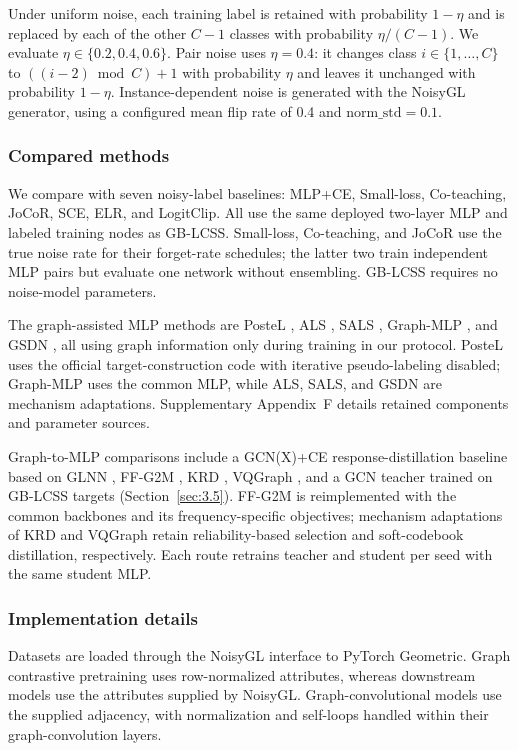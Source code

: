 \documentclass[times,review,10pt]{elsarticle}
\theoremstyle{definition}
\theoremstyle{plain}
\begin{document}
Under uniform noise, each training label is retained with probability \(1-\eta\) and is replaced by each of the other \(C-1\) classes with probability \(\eta/(C-1)\). We evaluate \(\eta\in\{0.2,0.4,0.6\}\). Pair noise uses \(\eta=0.4\): it changes class \(i\in\{1,\ldots,C\}\) to \(((i-2)\bmod C)+1\) with probability \(\eta\) and leaves it unchanged with probability \(1-\eta\). Instance-dependent noise is generated with the NoisyGL generator, using a configured mean flip rate of 0.4 and \(\text{norm\_std}=0.1\).

\subsubsection{Compared methods}\label{sec:4.1.3}

We compare with seven noisy-label baselines: MLP+CE, Small-loss, Co-teaching, JoCoR, SCE, ELR, and LogitClip. All use the same deployed two-layer MLP and labeled training nodes as GB-LCSS. Small-loss, Co-teaching, and JoCoR use the true noise rate for their forget-rate schedules; the latter two train independent MLP pairs but evaluate one network without ensembling. GB-LCSS requires no noise-model parameters.

The graph-assisted MLP methods are PosteL \cite{ref54}, ALS \cite{ref55}, SALS \cite{ref56}, Graph-MLP \cite{ref3}, and GSDN \cite{ref40}, all using graph information only during training in our protocol. PosteL uses the official target-construction code with iterative pseudo-labeling disabled; Graph-MLP uses the common MLP, while ALS, SALS, and GSDN are mechanism adaptations. Supplementary Appendix~F details retained components and parameter sources.

Graph-to-MLP comparisons include a GCN(X)+CE response-distillation baseline based on GLNN \cite{ref4}, FF-G2M \cite{ref45}, KRD \cite{ref46}, VQGraph \cite{ref47}, and a GCN teacher trained on GB-LCSS targets (Section~\ref{sec:3.5}). FF-G2M is reimplemented with the common backbones and its frequency-specific objectives; mechanism adaptations of KRD and VQGraph retain reliability-based selection and soft-codebook distillation, respectively. Each route retrains teacher and student per seed with the same student MLP.

\subsubsection{Implementation details}\label{sec:4.1.4}

Datasets are loaded through the NoisyGL interface to PyTorch Geometric. Graph contrastive pretraining uses row-normalized attributes, whereas downstream models use the attributes supplied by NoisyGL. Graph-convolutional models use the supplied adjacency, with normalization and self-loops handled within their graph-convolution layers.
\end{document}
